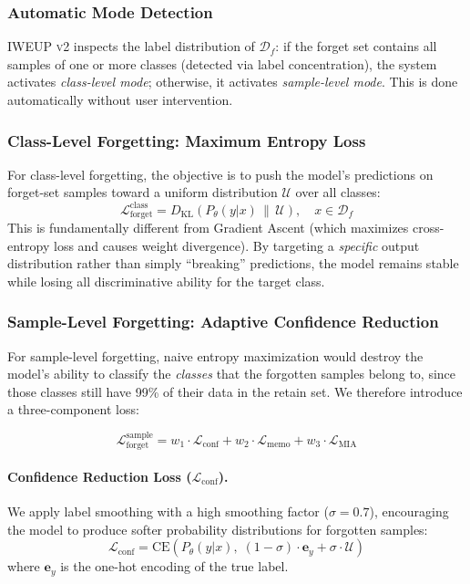 \documentclass[11pt]{article}
\newcommand{\method}{\textsc{IWEUP v2}}
\newcommand{\Loss}{\mathcal{L}}
\begin{document}
\subsubsection{Automatic Mode Detection}
\method{} inspects the label distribution of $\mathcal{D}_f$: if the forget set contains all samples of one or more classes (detected via label concentration), the system activates \textit{class-level mode}; otherwise, it activates \textit{sample-level mode}. This is done automatically without user intervention.

\subsubsection{Class-Level Forgetting: Maximum Entropy Loss}
For class-level forgetting, the objective is to push the model's predictions on forget-set samples toward a uniform distribution $\mathcal{U}$ over all classes:
\begin{equation}
    \Loss_{\text{forget}}^{\text{class}} = D_{\text{KL}}\left(P_\theta(y|x) \,\|\, \mathcal{U}\right), \quad x \in \mathcal{D}_f
    \label{eq:class_loss}
\end{equation}
This is fundamentally different from Gradient Ascent (which maximizes cross-entropy loss and causes weight divergence). By targeting a \textit{specific} output distribution rather than simply ``breaking'' predictions, the model remains stable while losing all discriminative ability for the target class.

\subsubsection{Sample-Level Forgetting: Adaptive Confidence Reduction}
For sample-level forgetting, naive entropy maximization would destroy the model's ability to classify the \textit{classes} that the forgotten samples belong to, since those classes still have 99\% of their data in the retain set. We therefore introduce a three-component loss:

\begin{equation}
    \Loss_{\text{forget}}^{\text{sample}} = w_1 \cdot \Loss_{\text{conf}} + w_2 \cdot \Loss_{\text{memo}} + w_3 \cdot \Loss_{\text{MIA}}
    \label{eq:sample_loss}
\end{equation}

\paragraph{Confidence Reduction Loss ($\Loss_{\text{conf}}$).}
We apply label smoothing with a high smoothing factor ($\sigma = 0.7$), encouraging the model to produce softer probability distributions for forgotten samples:
\begin{equation}
    \Loss_{\text{conf}} = \text{CE}\left(P_\theta(y|x),\; (1-\sigma) \cdot \mathbf{e}_y + \sigma \cdot \mathcal{U}\right)
\end{equation}
where $\mathbf{e}_y$ is the one-hot encoding of the true label.
\end{document}
